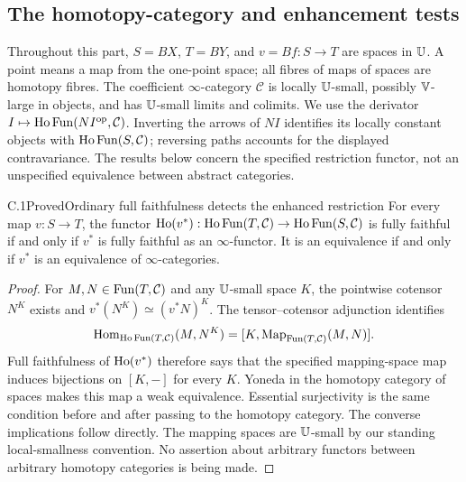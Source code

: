 \subsection{The homotopy-category and enhancement tests}
Throughout this part, $S=BX$, $T=BY$, and $v=Bf:S\to T$ are spaces in $\mathbb U$.  A point means a map from the one-point space; all fibres of maps of spaces are homotopy fibres.  The coefficient $\infty$-category $\mathcal C$ is locally $\mathbb U$-small, possibly $\mathbb V$-large in objects, and has $\mathbb U$-small limits and colimits.  We use the derivator $I\mapsto\operatorname{Ho}\operatorname{Fun}(NI^{\mathrm{op}},\mathcal C)$.  Inverting the arrows of $NI$ identifies its locally constant objects with $\operatorname{Ho}\operatorname{Fun}(S,\mathcal C)$; reversing paths accounts for the displayed contravariance.  The results below concern the specified restriction functor, not an unspecified equivalence between abstract categories.

\begin{claim}{C.1}{Proved}{Ordinary full faithfulness detects the enhanced restriction}
For every map $v:S\to T$, the functor $\operatorname{Ho}(v^*):\operatorname{Ho}\operatorname{Fun}(T,\mathcal C)\to\operatorname{Ho}\operatorname{Fun}(S,\mathcal C)$ is fully faithful if and only if $v^*$ is fully faithful as an $\infty$-functor.  It is an equivalence if and only if $v^*$ is an equivalence of $\infty$-categories.
\end{claim}
\begin{proof}
For $M,N\in\operatorname{Fun}(T,\mathcal C)$ and any $\mathbb U$-small space $K$, the pointwise cotensor $N^K$ exists and $v^*(N^K)\simeq(v^*N)^K$.  The tensor--cotensor adjunction identifies
\[
 \operatorname{Hom}_{\operatorname{Ho}\operatorname{Fun}(T,\mathcal C)}(M,N^K)
 = [K,\operatorname{Map}_{\operatorname{Fun}(T,\mathcal C)}(M,N)] .
\]
Full faithfulness of $\operatorname{Ho}(v^*)$ therefore says that the specified mapping-space map induces bijections on $[K,-]$ for every $K$.  Yoneda in the homotopy category of spaces makes this map a weak equivalence.  Essential surjectivity is the same condition before and after passing to the homotopy category.  The converse implications follow directly.  The mapping spaces are $\mathbb U$-small by our standing local-smallness convention.  No assertion about arbitrary functors between arbitrary homotopy categories is being made.
\end{proof}

